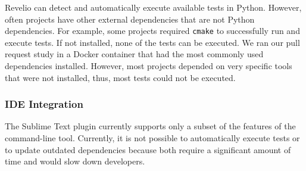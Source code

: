 Revelio can detect and automatically execute available tests in Python. However, often projects have other external dependencies that are not Python dependencies. For example, some projects required \texttt{cmake} to successfully run and execute tests. If not installed, none of the tests can be executed. We ran our pull request study in a Docker container that had the most commonly used dependencies installed. However, most projects depended on very specific tools that were not installed, thus, most tests could not be executed.  

\subsubsection{IDE Integration}

The Sublime Text plugin currently supports only a subset of the features of the command-line tool. Currently, it is not possible to automatically execute tests or to update outdated dependencies because both require a significant amount of time and would slow down developers. 
